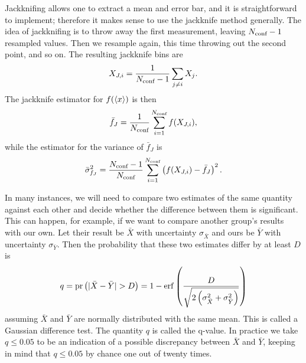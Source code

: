 Jackknifing allows one to extract a mean and error bar,
and it is straightforward to implement; 
therefore it makes sense to use the jackknife method generally.
The idea of jackknifing is to throw away the first measurement, 
leaving $N_{\text{conf}}-1$ resampled values. Then we resample again, this
time throwing out the second point, and so on. The resulting
jackknife bins are
\begin{equation}
  X_{J,i}=\frac{1}{N_{\text{conf}}-1}\sum_{j\neq i}X_j.
\end{equation}
The jackknife estimator for $f(\ev{x})$ is then
\begin{equation}
  \bar{f}_J=\frac{1}{N_{\text{conf}}}\sum_{i=1}^{N_{\text{conf}}}f(X_{J,i}),
\end{equation}
while the estimator for the variance of $\bar{f}_J$ is
\begin{equation}
  \bar{\sigma}^2_{f_J}=\frac{N_{\text{conf}}-1}{N_{\text{conf}}}\sum_{i=1}^{N_{\text{conf}}}
    \left(f(X_{J,i})-\bar{f}_J\right)^2.
\end{equation}

In many instances, we will need to compare two estimates 
of the same quantity against each other and decide whether the difference 
between them is significant. This can happen, for example, if we want to
compare another group's results with our own. Let their result
be $\bar{X}$ with uncertainty $\sigma_{\bar{X}}$ and ours be
$\bar{Y}$ with uncertainty $\sigma_{\bar{Y}}$. Then the probability
that these two estimates differ by at least $D$ is
\begin{equation}\index{Gaussian difference test}
  q=\pr{|\bar{X}-\bar{Y}|>D}
    =1-\erf\left(\frac{D}{\sqrt{2
     \left(\sigma_{\bar{X}}^2+\sigma_{\bar{Y}}^2\right)}}\right)
\end{equation}
assuming $\bar{X}$ and $\bar{Y}$ are normally distributed with
the same mean. This is called a Gaussian difference test. 
The quantity $q$ is called the q-value.
In practice we take $q\leq0.05$ to be an indication of a possible 
discrepancy between $\bar{X}$ and $\bar{Y}$, keeping in mind that 
$q\leq0.05$ by chance one out of twenty times.

